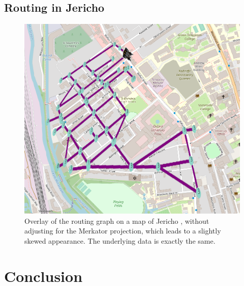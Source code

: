 \documentclass[12pt, a4paper]{article}
\begin{document}
  \subsection{Routing in Jericho}
  \begin{figure}[H]
    \centering
    \includegraphics[width=0.6\linewidth]{figures/jericho.png}
    \caption{Overlay of the routing graph on a map of Jericho \parencite{OpenStreetMap}, without adjusting for the Merkator projection, which leads to a slightly skewed appearance. The underlying data is exactly the same.}
  \end{figure}

  \section{Conclusion}

  \pagebreak
  \printbibliography
\end{document}

